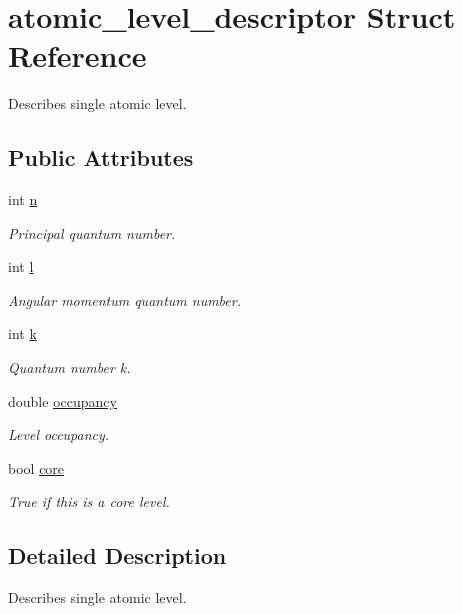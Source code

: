 \hypertarget{structatomic__level__descriptor}{}\section{atomic\+\_\+level\+\_\+descriptor Struct Reference}
\label{structatomic__level__descriptor}


Describes single atomic level.  


\subsection*{Public Attributes}
\begin{DoxyCompactItemize}
\item 
int \hyperlink{structatomic__level__descriptor_ab90b943aaee4e6747cd9dd8647212b1c}{n}
\begin{DoxyCompactList}\small\item\em Principal quantum number. \end{DoxyCompactList}\item 
int \hyperlink{structatomic__level__descriptor_ad0bb3ad2f4eab20df397def844ff210f}{l}
\begin{DoxyCompactList}\small\item\em Angular momentum quantum number. \end{DoxyCompactList}\item 
int \hyperlink{structatomic__level__descriptor_a6caa285be48c2f0ac8e80c76c04bf8ec}{k}
\begin{DoxyCompactList}\small\item\em Quantum number k. \end{DoxyCompactList}\item 
double \hyperlink{structatomic__level__descriptor_ac4be6454ae689054fdd700814f1c9030}{occupancy}
\begin{DoxyCompactList}\small\item\em Level occupancy. \end{DoxyCompactList}\item 
bool \hyperlink{structatomic__level__descriptor_a6b236231375cd46a86d69c189e96a08d}{core}
\begin{DoxyCompactList}\small\item\em True if this is a core level. \end{DoxyCompactList}\end{DoxyCompactItemize}


\subsection{Detailed Description}
Describes single atomic level. 

